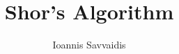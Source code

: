 \documentclass[12pt]{article}
\title{Shor’s Algorithm}
\author{Ioannis Savvaidis}
\date{}
\begin{document}
\newenvironment{statement}[2][Statement]{\begin{trivlist}
\item[\hskip \labelsep {\bfseries #1}\hskip \labelsep {\bfseries #2.}]}{\end{trivlist}}

\maketitle



\vspace{15cm} %



\end{document}

